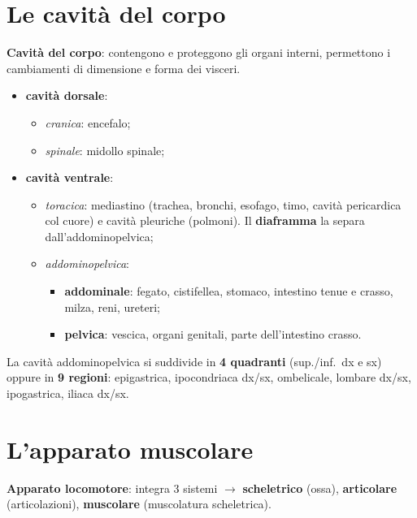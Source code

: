 \section{Le cavità del corpo}

\textbf{Cavità del corpo}: contengono e proteggono gli organi interni, permettono i cambiamenti di
dimensione e forma dei visceri.
\begin{itemize}
  \item \textbf{cavità dorsale}:
    \begin{itemize}
      \item \textit{cranica}: encefalo;
      \item \textit{spinale}: midollo spinale;
    \end{itemize}
  \item \textbf{cavità ventrale}:
    \begin{itemize}
      \item \textit{toracica}: mediastino (trachea, bronchi, esofago, timo, cavità pericardica col
        cuore) e cavità pleuriche (polmoni). Il \textbf{diaframma} la separa dall'addominopelvica;
      \item \textit{addominopelvica}:
        \begin{itemize}
          \item \textbf{addominale}: fegato, cistifellea, stomaco, intestino tenue e crasso, milza,
            reni, ureteri;
          \item \textbf{pelvica}: vescica, organi genitali, parte dell'intestino crasso.
        \end{itemize}
    \end{itemize}
\end{itemize}
La cavità addominopelvica si suddivide in \textbf{4 quadranti} (sup./inf.\ dx e sx) oppure in
\textbf{9 regioni}: epigastrica, ipocondriaca dx/sx, ombelicale, lombare dx/sx, ipogastrica,
iliaca dx/sx.

\section{L'apparato muscolare}

\textbf{Apparato locomotore}: integra 3 sistemi $\rightarrow$ \textbf{scheletrico} (ossa),
\textbf{articolare} (articolazioni), \textbf{muscolare} (muscolatura scheletrica).

